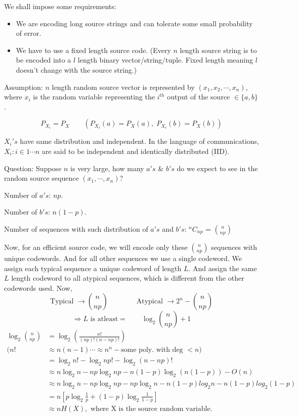 \documentclass{article}
\newcommand*{\Comb}[2]{{}^{#1}C_{#2}}%
\begin{document}
\begin{enumerate}
    We shall impose some requirements:
    \begin{itemize}
        \item We are encoding long source strings and can tolerate some small probability of error.
        \item We have to use a fixed length source code. (Every $n$ length source string is to be encoded into a $l$ length binary vector/string/tuple. Fixed length meaning $l$ doesn't change with the source string.)
    \end{itemize}
    Assumption: $n$ length random source vector is represented by $(x_1,x_2,\cdots,x_n)$, where $x_i$ is the random variable representing the $i^{th}$ output of the source $\in \{a,b\}$.

    $$ P_{X_i}= P_X \qquad (P_{X_i}(a)= P_X(a),\;P_{X_i}(b)= P_X(b))$$

    $X_i's$ have same distribution and independent. In the language of communications, $X_i : i \in 1\cdots n$ are said to be independent and identically distributed (IID).

    Question: Suppose $n$ is very large, how many $a's$ \& $b's$ do we expect to see in the random source sequence $(x_1,\cdots, x_n)$?

    Number of $a's$: $np$.

    Number of $b's$: $n(1-p)$.

    Number of sequences with such distribution of $a's$ and $b's$: $\Comb{n}{np}$ = ${n \choose np}$

    Now, for an efficient source code, we will encode only these $n \choose np$ sequences with unique codewords. And for all other sequences we use a single codeword.
    We assign each typical sequence a unique codeword of length $L$. And assign the same $L$ length codeword to all atypical sequences, which is different from the other codewords used. Now,
    $$\text{Typical }\to {n \choose np} \qquad\qquad \text{Atypical }\to 2^n- {n \choose np} $$
    $$ \Rightarrow L \text{ is atleast}=\qquad \log_2 {n \choose np} +1 $$
    \begin{align*}
        \log_2 {n \choose np} &= \log_2 \left(\frac{n!}{(np)!(n-np)!} \right) \\
        (n! &\approx n(n-1)\cdots \approx n^n-\text{some poly. with deg }< n) \\
        &= \log_2 n! - \log_2 np! - \log_2{(n-np)!} \\
        &\approx n\log_2 n - np \log_2 np - n(1-p)\log_2{(n(1-p))}-O(n) \\
        &\approx n\log_2 n - np \log_2 np - np \log_2 n - n(1-p)log_2 n - n(1-p)log_2 (1-p) \\
        &=n \left[p\log_2 \frac{1}{p}+ (1-p)\log_2 \frac{1}{1-p} \right]\\
        &\approx nH(X), \text{ where X is the source random variable.}
    \end{align*}


\end{enumerate}
\end{document}
